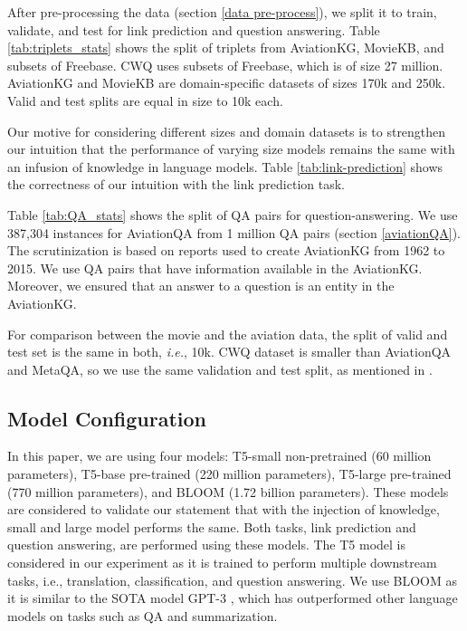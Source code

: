 \documentclass[11pt]{article}
\begin{document}
After pre-processing the data (section \ref{data pre-process}), we split it to train, validate, and test for link prediction and question answering. Table \ref{tab:triplets_stats} shows the split of triplets from AviationKG, MovieKB, and subsets of Freebase. CWQ uses subsets of Freebase, which is of size 27 million. AviationKG and MovieKB are domain-specific datasets of sizes 170k and 250k. Valid and test splits are equal in size to 10k each. 
\par
Our motive for considering different sizes and domain datasets is to strengthen our intuition that the performance of varying size models remains the same with an infusion of knowledge in language models. Table \ref{tab:link-prediction} shows the correctness of our intuition with the link prediction task.
\par
Table \ref{tab:QA_stats} shows the split of QA pairs for question-answering. We use 387,304 instances for AviationQA from 1 million QA pairs (section \ref{aviationQA}). The scrutinization is based on reports used to create AviationKG \cite{agarwal2022knowledge} from 1962 to 2015. We use QA pairs that have information available in the AviationKG. Moreover, we ensured that an answer to a question is an entity in the AviationKG.
\par
For comparison between the movie and the aviation data, the split of valid and test set is the same in both, \textit{i.e.}, 10k. CWQ dataset is smaller than AviationQA and MetaQA, so we use the same validation and test split, as mentioned in \citet{saxena2022sequence}.




\subsection{Model Configuration} \label{model_config}
In this paper, we are using four models: T5-small non-pretrained (60 million parameters), T5-base pre-trained (220 million parameters), T5-large pre-trained (770 million parameters), and BLOOM (1.72 billion parameters).
These models are considered to validate our statement that with the injection of knowledge, small and large model performs the same. 
Both tasks, link prediction and question answering, are performed using these models.  
The T5 model is considered in our experiment as it is trained to perform multiple downstream tasks, i.e., translation, classification, and question answering. We use  BLOOM as it is similar to the SOTA model GPT-3 \cite{brown2020language}, which has outperformed other language models on tasks such as QA and summarization.
\end{document}
